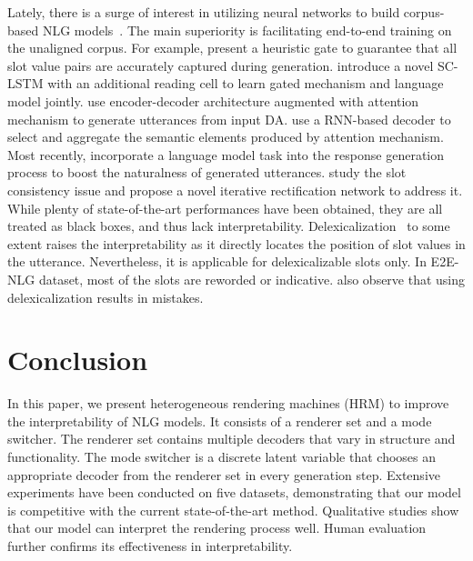 \documentclass[letterpaper]{article} %
\begin{document}
	Lately, there is a surge of interest in utilizing neural networks to build corpus-based NLG models~\citep{wen-etal-2015-stochastic,dusek-jurcicek-2016-sequence,tran-nguyen-2017-natural,li-etal-2020-slot}. The main superiority is facilitating end-to-end training on the unaligned corpus. For example, \citet{wen-etal-2015-stochastic} present a heuristic gate to guarantee that all slot value pairs are accurately captured during generation. \citet{wen-etal-2015-semantically} introduce a novel SC-LSTM with an additional reading cell to learn gated mechanism and language model jointly.  \citet{dusek-jurcicek-2016-sequence} use encoder-decoder architecture augmented with attention mechanism to generate utterances from input DA. \citet{tran-nguyen-2017-natural} use a RNN-based decoder to select and aggregate the semantic elements produced by attention mechanism. Most recently, \citet{zhu2019multi}  incorporate a language model task into the response generation process to boost the naturalness of generated utterances. \citet{li-etal-2020-slot} study the slot consistency issue and propose a novel iterative rectification network to address it. While plenty of state-of-the-art performances have been obtained, they are all treated as black boxes, and thus lack interpretability. Delexicalization~\citep{wen-etal-2015-semantically,tran-nguyen-2017-natural,li-etal-2020-handling} to some extent raises the interpretability as it directly locates the position of slot values in the utterance. Nevertheless, it is applicable for delexicalizable slots only. In E2E-NLG dataset, most of the slots are reworded or indicative. \citet{nayak2017plan} also observe that using delexicalization results in mistakes.

\section{Conclusion}

	In this paper, we present heterogeneous rendering machines (HRM) to improve the interpretability of NLG models. It consists of a renderer set and a mode switcher. The renderer set contains multiple decoders that vary in structure and functionality. The mode switcher is a discrete latent variable that chooses an appropriate decoder from the renderer set in every generation step. Extensive experiments have been conducted on five datasets, demonstrating that our model is competitive with the current state-of-the-art method. Qualitative studies show that our model can interpret the rendering process well. Human evaluation further confirms its effectiveness in interpretability.
\end{document}
